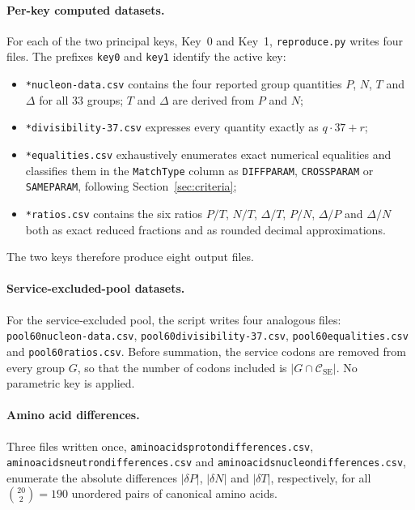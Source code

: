 \documentclass[11pt,a4paper]{article}
\renewcommand{\_}{\origunderscore\allowbreak}
\begin{document}
\paragraph{Per-key computed datasets.}
For each of the two principal keys, Key~0 and Key~1,
\texttt{reproduce.py} writes four files. The prefixes
\texttt{key0\_} and \texttt{key1\_} identify the active key:
\begin{itemize}
  \item \texttt{*\_nucleon-data.csv} contains the four reported
        group quantities $P$, $N$, $T$ and $\Delta$ for all 33
        groups; $T$ and $\Delta$ are derived from $P$ and $N$;
  \item \texttt{*\_divisibility-37.csv} expresses every quantity
        exactly as $q\cdot37+r$;
  \item \texttt{*\_equalities.csv} exhaustively enumerates exact
        numerical equalities and classifies them in the
        \texttt{Match\_Type} column as \texttt{DIFF\_PARAM},
        \texttt{CROSS\_PARAM} or \texttt{SAME\_PARAM}, following
        Section~\ref{sec:criteria};
  \item \texttt{*\_ratios.csv} contains the six ratios $P/T$, $N/T$,
        $\Delta/T$, $P/N$, $\Delta/P$ and $\Delta/N$ both as exact
        reduced fractions and as rounded decimal approximations.
\end{itemize}
The two keys therefore produce eight output files.

\paragraph{Service-excluded-pool datasets.}
For the service-excluded pool, the script writes four analogous
files:
\texttt{pool60\_nucleon-data.csv},
\texttt{pool60\_divisibility-37.csv},
\texttt{pool60\_equalities.csv} and
\texttt{pool60\_ratios.csv}. Before summation, the service codons are
removed from every group $G$, so that the number of codons included is
$|G\cap\mathcal{C}_{\mathrm{SE}}|$. No parametric key is applied.

\paragraph{Amino acid differences.}
Three files written once,
\texttt{amino\_acids\_proton\_differences.csv},
\texttt{amino\_acids\_neutron\_differences.csv} and
\texttt{amino\_acids\_nucleon\_differences.csv}, enumerate the
absolute differences $|\delta P|$, $|\delta N|$ and $|\delta T|$,
respectively, for all $\binom{20}{2}=190$ unordered pairs of
canonical amino acids.
\end{document}
